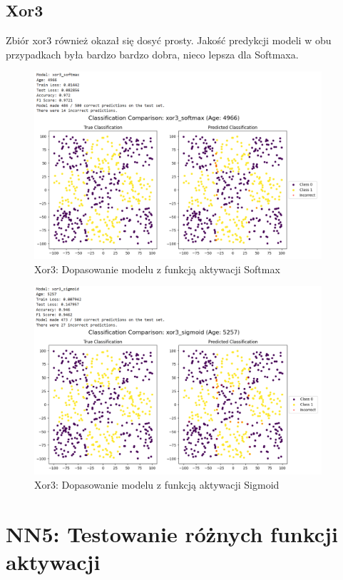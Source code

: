 \documentclass{article}
\begin{document}
\subsection*{Xor3}
Zbiór xor3 również okazał się dosyć prosty. Jakość predykcji modeli w obu przypadkach była bardzo bardzo dobra, nieco lepsza dla Softmaxa.
\begin{figure}[H]
    \centering
    \includegraphics[width=0.95\textwidth]{img/nn4/xor3_softmax.png}
    \caption{Xor3: Dopasowanie modelu z funkcją aktywacji Softmax}
\end{figure}
\begin{figure}[H]
    \centering
    \includegraphics[width=0.95\textwidth]{img/nn4/xor3_sigmoid.png}
    \caption{Xor3: Dopasowanie modelu z funkcją aktywacji Sigmoid}
\end{figure}


\section*{NN5: Testowanie różnych funkcji aktywacji}
\end{document}
